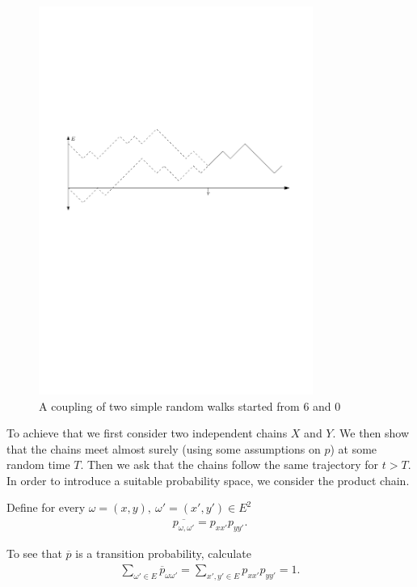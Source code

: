 \begin{figure}[h!]
	\centering
	\includegraphics[width=0.8\textwidth]{figures/coupling.pdf}
	\caption{A coupling of two simple random walks started from $6$ and $0$}
\end{figure}


To achieve that we first consider two independent chains $X$ and $Y$. We then show that the chains meet almost surely (using some assumptions on $p$) at some random time $T$. Then we ask that the chains follow the same trajectory for $t>T$. In order to introduce a suitable probability space, we consider the product chain.

\begin{defn}
	Define for every $\omega=(x,y), \ \omega'=(x',y') \in E^2$ 
	\begin{align}
	\boxed{\overline{p_{\omega, \omega'}}=p_{xx'}p_{yy'} }.
	\end{align}
\end{defn}
\begin{rmk}[]
	To see that $\overline{p}$ is a transition probability, calculate
	\begin{align}
		\sum_{\omega'\in E}^{} \overline{p}_{\omega \omega'} = \sum_{x',y' \in E}^{} p_{xx'}p_{yy'} = 1. 
	\end{align}
\end{rmk}


